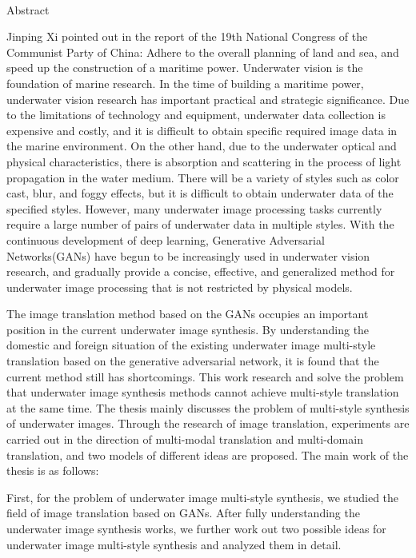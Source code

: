 \newpage

\begin{center}
  {\sanhao[1.5]\heiti\oucetitle\\\vskip7pt Abstract}
\end{center}
{\normalsize\songti

Jinping Xi pointed out in the report of the 19th National Congress of the Communist Party of China: Adhere to the overall planning of land and sea, and speed up the construction of a maritime power. Underwater vision is the foundation of marine research. In the time of building a maritime power, underwater vision research has important practical and strategic significance. Due to the limitations of technology and equipment, underwater data collection is expensive and costly, and it is difficult to obtain specific required image data in the marine environment. On the other hand, due to the underwater optical and physical characteristics, there is absorption and scattering in the process of light propagation in the water medium. There will be a variety of styles such as color cast, blur, and foggy effects, but it is difficult to obtain underwater data of the specified styles. However, many underwater image processing tasks currently require a large number of pairs of underwater data in multiple styles. With the continuous development of deep learning, Generative Adversarial Networks(GANs) have begun to be increasingly used in underwater vision research, and gradually provide a concise, effective, and generalized method for underwater image processing that is not restricted by physical models.

The image translation method based on the GANs occupies an important position in the current underwater image synthesis. By understanding the domestic and foreign situation of the existing underwater image multi-style translation based on the generative adversarial network, it is found that the current method still has shortcomings. This work research and solve the problem that underwater image synthesis methods cannot achieve multi-style translation at the same time. The thesis mainly discusses the problem of multi-style synthesis of underwater images. Through the research of image translation, experiments are carried out in the direction of multi-modal translation and multi-domain translation, and two models of different ideas are proposed. The main work of the thesis is as follows:

First, for the problem of underwater image multi-style synthesis, we studied the field of image translation based on GANs. After fully understanding the underwater image synthesis works, we further work out two possible ideas for underwater image multi-style synthesis and analyzed them in detail.

}
